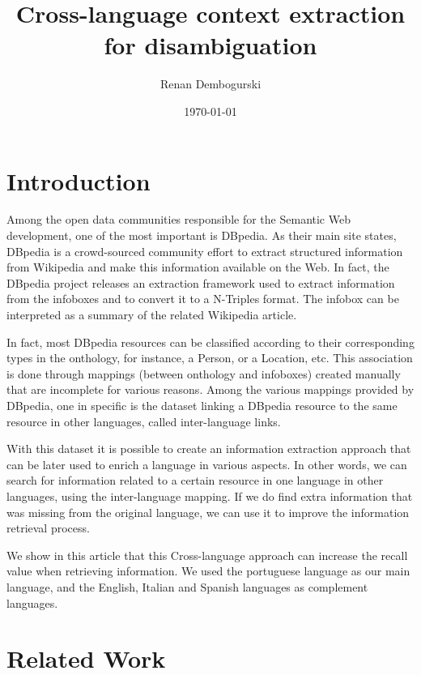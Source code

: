 \documentclass[10pt,a4paper]{llncs}
\title{Cross-language context extraction for disambiguation}
\author{Renan Dembogurski}
\date{\today}
\begin{document}
\maketitle

\begin{abstract}
\end{abstract}

\section{Introduction}

Among the open data communities responsible for the Semantic Web development, one of the most important is DBpedia. As their main site states, DBpedia is a crowd-sourced community effort to extract structured information from Wikipedia and make this information available on the Web. In fact, the DBpedia project releases an extraction framework used to extract information from the infoboxes and to convert it to a N-Triples format. The infobox can be interpreted as a summary of the related Wikipedia article.

In fact, most DBpedia resources can be classified according to their corresponding types in the onthology, for instance, a Person, or a Location, etc. This association is done through mappings (between onthology and infoboxes) created manually that are incomplete for various reasons. Among the various mappings provided by DBpedia, one in specific is the dataset linking a DBpedia resource to the same resource in other languages, called inter-language links.

With this dataset it is possible to create an information extraction approach that can be later used to enrich a language in various aspects. In other words, we can search for information related to a certain resource in one language in other languages, using the inter-language mapping. If we do find extra information that was missing from the original language, we can use it to improve the information retrieval process.

We show in this article that this Cross-language approach can increase the recall value when retrieving information. We used the portuguese language as our main language, and the English, Italian and Spanish languages as complement languages.

\section{Related Work}
\end{document}
